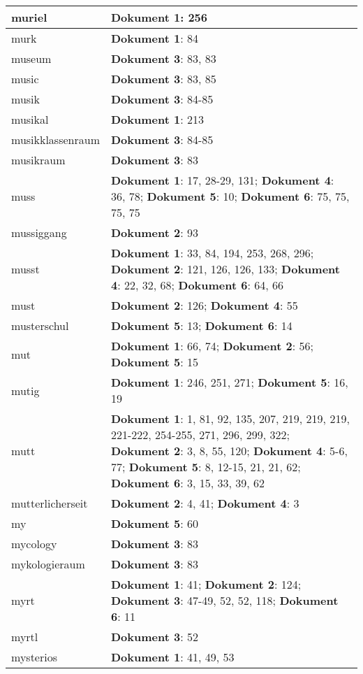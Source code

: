 \documentclass[a5paper]{article}
\begin{document}
\begin{longtable}[l]{|l|p{3in}|}
\hline
muriel & \textbf{Dokument 1}: 256 \\
\hline
murk & \textbf{Dokument 1}: 84 \\
\hline
museum & \textbf{Dokument 3}: 83, 83 \\
\hline
music & \textbf{Dokument 3}: 83, 85 \\
\hline
musik & \textbf{Dokument 3}: 84-85 \\
\hline
musikal & \textbf{Dokument 1}: 213 \\
\hline
musikklassenraum & \textbf{Dokument 3}: 84-85 \\
\hline
musikraum & \textbf{Dokument 3}: 83 \\
\hline
muss & \textbf{Dokument 1}: 17, 28-29, 131; \textbf{Dokument 4}: 36, 78; \textbf{Dokument 5}: 10; \textbf{Dokument 6}: 75, 75, 75, 75 \\
\hline
mussiggang & \textbf{Dokument 2}: 93 \\
\hline
musst & \textbf{Dokument 1}: 33, 84, 194, 253, 268, 296; \textbf{Dokument 2}: 121, 126, 126, 133; \textbf{Dokument 4}: 22, 32, 68; \textbf{Dokument 6}: 64, 66 \\
\hline
must & \textbf{Dokument 2}: 126; \textbf{Dokument 4}: 55 \\
\hline
musterschul & \textbf{Dokument 5}: 13; \textbf{Dokument 6}: 14 \\
\hline
mut & \textbf{Dokument 1}: 66, 74; \textbf{Dokument 2}: 56; \textbf{Dokument 5}: 15 \\
\hline
mutig & \textbf{Dokument 1}: 246, 251, 271; \textbf{Dokument 5}: 16, 19 \\
\hline
mutt & \textbf{Dokument 1}: 1, 81, 92, 135, 207, 219, 219, 219, 221-222, 254-255, 271, 296, 299, 322; \textbf{Dokument 2}: 3, 8, 55, 120; \textbf{Dokument 4}: 5-6, 77; \textbf{Dokument 5}: 8, 12-15, 21, 21, 62; \textbf{Dokument 6}: 3, 15, 33, 39, 62 \\
\hline
mutterlicherseit & \textbf{Dokument 2}: 4, 41; \textbf{Dokument 4}: 3 \\
\hline
my & \textbf{Dokument 5}: 60 \\
\hline
mycology & \textbf{Dokument 3}: 83 \\
\hline
mykologieraum & \textbf{Dokument 3}: 83 \\
\hline
myrt & \textbf{Dokument 1}: 41; \textbf{Dokument 2}: 124; \textbf{Dokument 3}: 47-49, 52, 52, 118; \textbf{Dokument 6}: 11 \\
\hline
myrtl & \textbf{Dokument 3}: 52 \\
\hline
mysterios & \textbf{Dokument 1}: 41, 49, 53 \\

\end{longtable}
\end{document}

